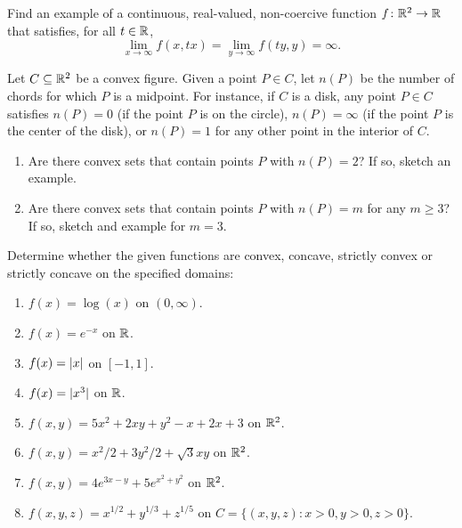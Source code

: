 \begin{problem}[Advanced]\cite[p.36, \#32]{peressini1988mathematics}
Find an example of a continuous, real-valued, non-coercive function $f\colon \mathbb{R}^2 \to \mathbb{R}$ that satisfies, for all $t \in \mathbb{R}$,
\begin{equation*}
\lim_{x \to \infty} f(x, tx) = \lim_{y \to \infty} f(ty, y) = \infty.
\end{equation*}
\end{problem}


\begin{problem}[Basic]
Let $C \subseteq \mathbb{R}^2$ be a convex figure.  Given a point $P \in C$, let $n(P)$ be the number of chords for which $P$ is a midpoint.
For instance, if $C$ is a disk, any point $P \in C$ satisfies $n(P)=0$ (if the point $P$ is on the circle), $n(P) = \infty$ (if the point $P$ is the center of the disk), or $n(P)=1$ for any other point in the interior of $C$.
\begin{enumerate}
	\item Are there convex sets that contain points $P$ with $n(P)=2$?  If so, sketch an example.
	\item Are there convex sets that contain points $P$ with $n(P)=m$ for any $m \geq 3$?  If so, sketch and example for $m=3$.
\end{enumerate}
\end{problem}

\begin{problem}[Basic]\cite[p.77, \#1,2,7]{peressini1988mathematics}
Determine whether the given functions are convex, concave, strictly convex or strictly concave on the specified domains:
\begin{enumerate}
	\item $f(x) = \log(x)$ on $(0,\infty)$.
	\item $f(x) = e^{-x}$ on $\mathbb{R}$.
	\item $f(x) = \lvert x \rvert$ on $[-1,1]$.
	\item $f(x) = \lvert x^3 \rvert$ on $\mathbb{R}$.
	\item $f(x,y) = 5x^2+2xy+y^2-x+2x+3$ on $\mathbb{R}^2$.
	\item $f(x,y) = x^2/2+3y^2/2+\sqrt{3}xy$ on $\mathbb{R}^2$.
	\item $f(x,y) = 4e^{3x-y}+5e^{x^2+y^2}$ on $\mathbb{R}^2$.
	\item $f(x,y,z) = x^{1/2} + y^{1/3} + z^{1/5}$ on $C = \{ (x,y,z) : x>0, y>0, z>0 \}$.
\end{enumerate}
\end{problem}

